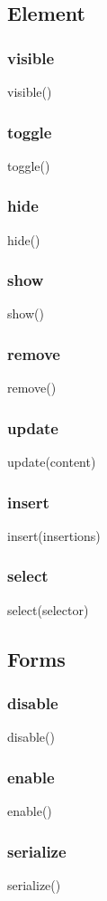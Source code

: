 {{{{{{{{\subsection{Element}
\subsubsection*{visible}
visible() {
\subsubsection*{toggle}
toggle() {
\subsubsection*{hide}
hide() {
\subsubsection*{show}
show() {
\subsubsection*{remove}
remove() {
\subsubsection*{update}
update(content) {
\subsubsection*{insert}
insert(insertions) {
\subsubsection*{select}
select(selector) {

\subsection{Forms}
\subsubsection*{disable}
disable() {
\subsubsection*{enable}
enable() {
\subsubsection*{serialize}
serialize() {

}}}}}}}}}}}}}}}}}}}
